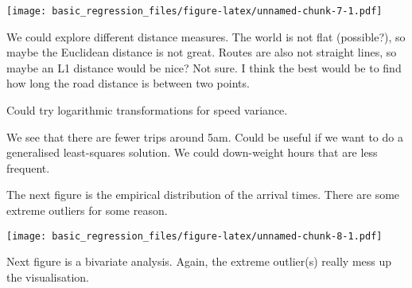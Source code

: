 \documentclass[]{article}
\newenvironment{Shaded}{\begin{snugshade}}{\end{snugshade}}
\newcommand{\DataTypeTok}[1]{\textcolor[rgb]{0.13,0.29,0.53}{#1}}
\newcommand{\DecValTok}[1]{\textcolor[rgb]{0.00,0.00,0.81}{#1}}
\newcommand{\FloatTok}[1]{\textcolor[rgb]{0.00,0.00,0.81}{#1}}
\newcommand{\KeywordTok}[1]{\textcolor[rgb]{0.13,0.29,0.53}{\textbf{#1}}}
\newcommand{\NormalTok}[1]{#1}
\newcommand{\OperatorTok}[1]{\textcolor[rgb]{0.81,0.36,0.00}{\textbf{#1}}}
\newcommand{\StringTok}[1]{\textcolor[rgb]{0.31,0.60,0.02}{#1}}
\begin{document}
\texttt{[image: basic\_regression\_files/figure-latex/unnamed-chunk-7-1.pdf]}

We could explore different distance measures. The world is not flat
(possible?), so maybe the Euclidean distance is not great. Routes are
also not straight lines, so maybe an L1 distance would be nice? Not
sure. I think the best would be to find how long the road distance is
between two points.

Could try logarithmic transformations for speed variance.

We see that there are fewer trips around 5am. Could be useful if we want
to do a generalised least-squares solution. We could down-weight hours
that are less frequent.

The next figure is the empirical distribution of the arrival times.
There are some extreme outliers for some reason.

\begin{Shaded}
\end{Shaded}

\texttt{[image: basic\_regression\_files/figure-latex/unnamed-chunk-8-1.pdf]}

Next figure is a bivariate analysis. Again, the extreme outlier(s)
really mess up the visualisation.
\end{document}
